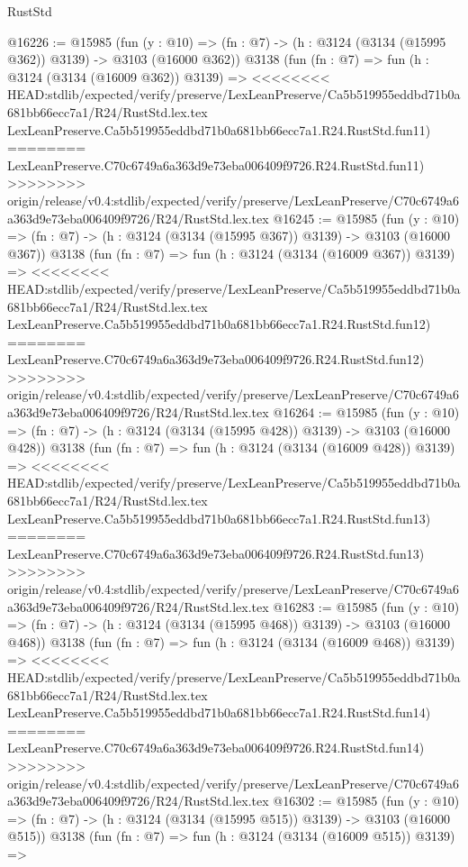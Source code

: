 \begin{lexlean}{RustStd}
\begin{coremodule}
{\begin{coremodule}
{{{{{{{{{{{{{{{{{{{{{{{{{{@16226 := @15985
    (fun (y : @10) => (fn : @7) -> (h : @3124 (@3134 (@15995 @362)) @3139) -> @3103 (@16000 @362))
    @3138
    (fun (fn : @7) =>
    fun (h : @3124 (@3134 (@16009 @362)) @3139) =>
<<<<<<<< HEAD:stdlib/expected/verify/preserve/LexLeanPreserve/Ca5b519955eddbd71b0a681bb66ecc7a1/R24/RustStd.lex.tex
    LexLeanPreserve.Ca5b519955eddbd71b0a681bb66ecc7a1.R24.RustStd.fun11)
========
    LexLeanPreserve.C70c6749a6a363d9e73eba006409f9726.R24.RustStd.fun11)
>>>>>>>> origin/release/v0.4:stdlib/expected/verify/preserve/LexLeanPreserve/C70c6749a6a363d9e73eba006409f9726/R24/RustStd.lex.tex
@16245 := @15985
    (fun (y : @10) => (fn : @7) -> (h : @3124 (@3134 (@15995 @367)) @3139) -> @3103 (@16000 @367))
    @3138
    (fun (fn : @7) =>
    fun (h : @3124 (@3134 (@16009 @367)) @3139) =>
<<<<<<<< HEAD:stdlib/expected/verify/preserve/LexLeanPreserve/Ca5b519955eddbd71b0a681bb66ecc7a1/R24/RustStd.lex.tex
    LexLeanPreserve.Ca5b519955eddbd71b0a681bb66ecc7a1.R24.RustStd.fun12)
========
    LexLeanPreserve.C70c6749a6a363d9e73eba006409f9726.R24.RustStd.fun12)
>>>>>>>> origin/release/v0.4:stdlib/expected/verify/preserve/LexLeanPreserve/C70c6749a6a363d9e73eba006409f9726/R24/RustStd.lex.tex
@16264 := @15985
    (fun (y : @10) => (fn : @7) -> (h : @3124 (@3134 (@15995 @428)) @3139) -> @3103 (@16000 @428))
    @3138
    (fun (fn : @7) =>
    fun (h : @3124 (@3134 (@16009 @428)) @3139) =>
<<<<<<<< HEAD:stdlib/expected/verify/preserve/LexLeanPreserve/Ca5b519955eddbd71b0a681bb66ecc7a1/R24/RustStd.lex.tex
    LexLeanPreserve.Ca5b519955eddbd71b0a681bb66ecc7a1.R24.RustStd.fun13)
========
    LexLeanPreserve.C70c6749a6a363d9e73eba006409f9726.R24.RustStd.fun13)
>>>>>>>> origin/release/v0.4:stdlib/expected/verify/preserve/LexLeanPreserve/C70c6749a6a363d9e73eba006409f9726/R24/RustStd.lex.tex
@16283 := @15985
    (fun (y : @10) => (fn : @7) -> (h : @3124 (@3134 (@15995 @468)) @3139) -> @3103 (@16000 @468))
    @3138
    (fun (fn : @7) =>
    fun (h : @3124 (@3134 (@16009 @468)) @3139) =>
<<<<<<<< HEAD:stdlib/expected/verify/preserve/LexLeanPreserve/Ca5b519955eddbd71b0a681bb66ecc7a1/R24/RustStd.lex.tex
    LexLeanPreserve.Ca5b519955eddbd71b0a681bb66ecc7a1.R24.RustStd.fun14)
========
    LexLeanPreserve.C70c6749a6a363d9e73eba006409f9726.R24.RustStd.fun14)
>>>>>>>> origin/release/v0.4:stdlib/expected/verify/preserve/LexLeanPreserve/C70c6749a6a363d9e73eba006409f9726/R24/RustStd.lex.tex
@16302 := @15985
    (fun (y : @10) => (fn : @7) -> (h : @3124 (@3134 (@15995 @515)) @3139) -> @3103 (@16000 @515))
    @3138
    (fun (fn : @7) =>
    fun (h : @3124 (@3134 (@16009 @515)) @3139) =>
}}}}}}}}}}}}}}}}}}}}}}}}}}
\end{coremodule}}
\end{coremodule}
\end{lexlean}
